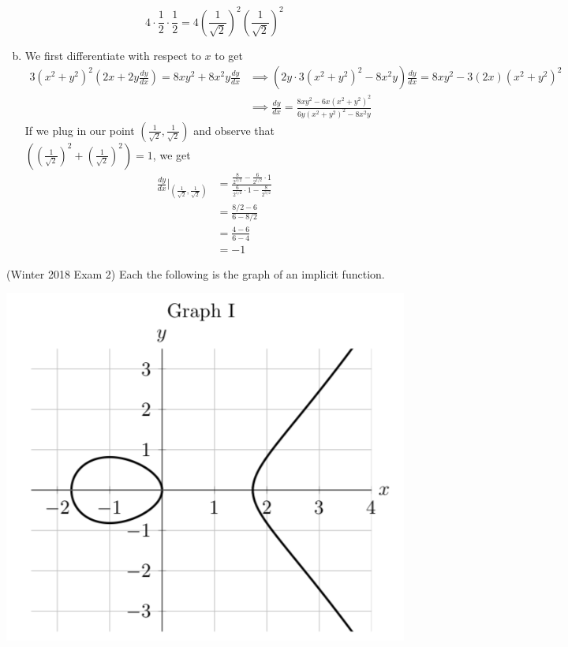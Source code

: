 \documentclass[11pt]{exam}
\newcommand{\dydx}{\frac{dy}{dx}}
\begin{document}
\begin{questions}
\begin{solution}
\begin{enumerate}[(a)]
\[      4\cdot \frac{1}{2} \cdot \frac{1}{2} = 4
      \left(\frac{1}{\sqrt{2}} \right)^2
      \left(\frac{1}{\sqrt{2}} \right)^2
    \]
  \item We first differentiate with respect to \(x\) to get
    \begin{align*}
      3(x^2+y^2)^2 \left(2x+2y\dydx\right) = 8xy^2+8x^2y\dydx
      & \implies (2y\cdot 3(x^2+y^2)^2-8x^2y) \dydx = 8xy^2-3(2x)(x^2+y^2)^2 \\
      & \implies \dydx =\frac{8xy^2-6x(x^2+y^2)^2}{6y(x^2+y^2)^2-8x^2y} 
    \end{align*}
    If we plug in our point \(\left( \frac{1}{\sqrt{2}},
      \frac{1}{\sqrt{2}} \right)\) and observe that \(\left( \left(
        \frac{1}{\sqrt{2}} \right)^2+\left( \frac{1}{\sqrt{2}}
      \right)^2 \right) = 1\), we get
    \begin{align*}
      \dydx|_{\left( \frac{1}{\sqrt{2}},\frac{1}{\sqrt{2}} \right)}
      & =
      \frac{\frac{8}{2^{3/2}}-\frac{6}{2^{1/2}} \cdot 1}{\frac{6}{2^{1/2}}\cdot 1 -
      \frac{8}{2^{3/2}}} \\
      & = \frac{8/2-6}{6-8/2}\\
      & = \frac{4-6}{6-4} \\
      & = -1
    \end{align*}
  \end{enumerate}
\end{solution}
\pagebreak
\question (Winter 2018 Exam 2)
	Each the following is the graph of an implicit function.
\begin{multicols}{3}
  \begin{center}
    \includegraphics[scale=0.3]{Figures/graphI.png}

\end{center}
\end{multicols}
\end{questions}
\end{document}
